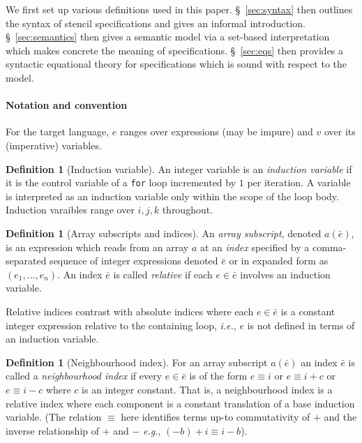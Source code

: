 \documentclass[10pt,preprint]{sigplanconf}
\newcounter{block}
\theoremstyle{definition}
\newtheorem{definition}[block]{Definition}
\newcommand{\ie}{\emph{i.e.}}
\newcommand{\eg}{\emph{e.g.}}
\begin{document}
We first set up various definitions used in this paper.
\S~\ref{sec:syntax} then outlines the syntax of stencil specifications
and gives an informal introduction. \S~\ref{sec:semantics} then
gives a semantic model via a set-based interpretation which makes
concrete the meaning of specifications. \S~\ref{sec:eqs} then provides
a syntactic equational theory for specifications which is
sound with respect to the model.


\paragraph{Notation and convention}

\renewcommand*{\arraystretch}{0.8}
For the target language, $e$ ranges over expressions (may be impure) and $v$
over its (imperative) variables. %

\begin{definition}[Induction variable]
  An integer variable is an \emph{induction variable} if it is the control
  variable of a \texttt{for} loop incremented by $1$ per iteration. A variable
  is interpreted as an induction variable only within the scope of the loop
  body. Induction varaibles range over $i, j, k$ throughout.
\end{definition}

\begin{definition}[Array subscripts and indices]
  An \emph{array subscript}, denoted $a(\bar{e})$, is an expression
  which reads from an array $a$ at an \emph{index} specified by a
  comma-separated sequence of integer expressions denoted $\bar{e}$ or
  in expanded form as $(e_1, \ldots, e_n)$. An index $\bar{e}$
  is called \emph{relative} if each $e \in \bar{e}$ involves an induction variable.

  Relative indices contrast with absolute indices where each $e \in
  \bar{e}$ is a constant integer expression relative to the containing
  loop, \ie{}, $e$ is not defined in terms of an induction variable.
\end{definition}

\begin{definition}[Neighbourhood index]
\label{def:neighbour}
  For an array subscript $a(\bar{e})$ an index $\bar{e}$ is called a
  \emph{neighbourhood index} if every $e \in \bar{e}$ is of the form
  $e \equiv i$ or $e \equiv i + c$ or $e \equiv i - c$ where $c$ is an
  integer constant. That is, a neighbourhood index is a relative index
  where each component is a constant translation of a base induction
  variable. (The relation $\equiv$ here identifies terms up-to
  commutativity of $+$ and the inverse relationship of $+$ and $-$
  \eg{}, $(-b) + i \equiv i - b$).
\end{definition}
\end{document}
